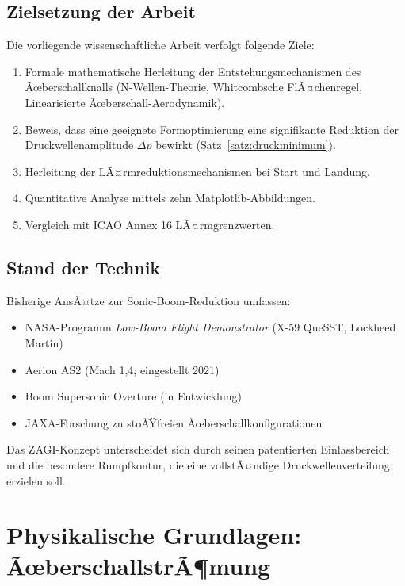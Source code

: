 ﻿\documentclass[12pt,a4paper]{article}
\theoremstyle{definition}
\theoremstyle{remark}
\begin{document}
\subsection{Zielsetzung der Arbeit}

Die vorliegende wissenschaftliche Arbeit verfolgt folgende Ziele:

\begin{enumerate}[label=\arabic*.]
  \item Formale mathematische Herleitung der Entstehungsmechanismen des Ãœberschallknalls
        (N-Wellen-Theorie, Whitcombsche FlÃ¤chenregel, Linearisierte Ãœberschall-Aerodynamik).
  \item Beweis, dass eine geeignete Formoptimierung eine signifikante Reduktion der
        Druckwellenamplitude $\Delta p$ bewirkt (Satz~\ref{satz:druckminimum}).
  \item Herleitung der LÃ¤rmreduktionsmechanismen bei Start und Landung.
  \item Quantitative Analyse mittels zehn Matplotlib-Abbildungen.
  \item Vergleich mit ICAO Annex 16 LÃ¤rmgrenzwerten.
\end{enumerate}

\subsection{Stand der Technik}

Bisherige AnsÃ¤tze zur Sonic-Boom-Reduktion umfassen:
\begin{itemize}
  \item NASA-Programm \emph{Low-Boom Flight Demonstrator} (X-59 QueSST, Lockheed Martin)
  \item Aerion AS2 (Mach 1,4; eingestellt 2021)
  \item Boom Supersonic Overture (in Entwicklung)
  \item JAXA-Forschung zu stoÃŸfreien Ãœberschallkonfigurationen
\end{itemize}
Das ZAGI-Konzept unterscheidet sich durch seinen patentierten Einlassbereich und die
besondere Rumpfkontur, die eine vollstÃ¤ndige Druckwellenverteilung erzielen soll.

\section{Physikalische Grundlagen: ÃœberschallstrÃ¶mung}
\label{sec:grundlagen}
\end{document}
